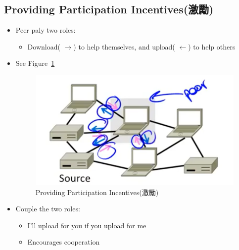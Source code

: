 \documentclass[12pt]{ctexart}   %
\begin{document}
	\subsection{Providing Participation Incentives(激勵)}
	\begin{itemize}
		\item Peer paly two roles:
		\begin{itemize}
			\item Download({\color{pink} $\rightarrow$}) to help themselves, and upload({\color{blue} $\leftarrow$}) to help others
		\end{itemize}
		\item See Figure~\ref{fig:8-9-3}
		  
		 \begin{figure}[h!] %
		\centering
		 \includegraphics[scale=0.7]{images/8-9-3}
		\caption{ Providing Participation Incentives(激勵) }
		 \label{fig:8-9-3}
		 \end{figure}
		 
		 \item Couple the two roles:
		 \begin{itemize}
		 	\item I'll upload for you if you upload for me
		 	\item Encourages cooperation
		 \end{itemize}
	\end{itemize}
	
\end{document}
